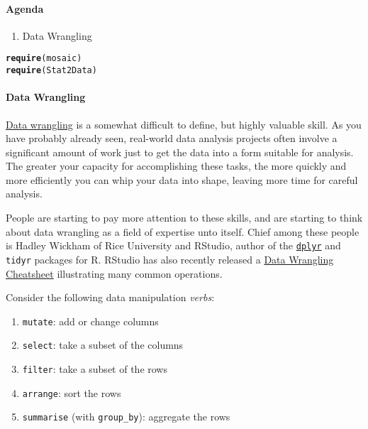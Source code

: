 \documentclass[10pt]{article}\usepackage[]{graphicx}\usepackage[]{color}
\makeatletter
\newcommand{\hlstd}[1]{\textcolor[rgb]{0.345,0.345,0.345}{#1}}%
\newcommand{\hlkwd}[1]{\textcolor[rgb]{0.737,0.353,0.396}{\textbf{#1}}}%
\newenvironment{kframe}{%
 \def\at@end@of@kframe{}%
 \ifinner\ifhmode%
  \def\at@end@of@kframe{\end{minipage}}%
  \begin{minipage}{\columnwidth}%
 \fi\fi%
 \def\FrameCommand##1{\hskip\@totalleftmargin \hskip-\fboxsep
 \colorbox{shadecolor}{##1}\hskip-\fboxsep
     \hskip-\linewidth \hskip-\@totalleftmargin \hskip\columnwidth}%
 \MakeFramed {\advance\hsize-\width
   \@totalleftmargin\z@ \linewidth\hsize
   \@setminipage}}%
 {\par\unskip\endMakeFramed%
 \at@end@of@kframe}
\newenvironment{knitrout}{}{} %
\newcommand{\cmd}[1]{\texttt{#1}}
\makeatother
\begin{document}
\paragraph{Agenda}
\begin{enumerate}
  \itemsep0em
  \item Data Wrangling
\end{enumerate}

\begin{knitrout}
\color{fgcolor}\begin{kframe}
\begin{alltt}
\hlkwd{require}\hlstd{(mosaic)}
\hlkwd{require}\hlstd{(Stat2Data)}
\end{alltt}
\end{kframe}
\end{knitrout}


\paragraph{Data Wrangling}

\href{http://en.wikipedia.org/wiki/Data_wrangling}{Data wrangling} is a somewhat difficult to define, but highly valuable skill. As you have probably already seen, real-world data analysis projects often involve a significant amount of work just to get the data into a form suitable for analysis. The greater your capacity for accomplishing these tasks, the more quickly and more efficiently you can whip your data into shape, leaving more time for careful analysis. 

People are starting to pay more attention to these skills, and are starting to think about data wrangling as a field of expertise unto itself. Chief among these people is Hadley Wickham of Rice University and RStudio, author of the \href{http://cran.r-project.org/web/packages/dplyr/vignettes/introduction.html}{\cmd{dplyr}} and \cmd{tidyr} packages for R. RStudio has also recently released a \href{http://www.rstudio.com/wp-content/uploads/2015/02/data-wrangling-cheatsheet.pdf}{Data Wrangling Cheatsheet} illustrating many common operations. 

Consider the following data manipulation \emph{verbs}:
\begin{enumerate}
  \itemsep0in
  \item \cmd{mutate}: add or change columns
  \item \cmd{select}: take a subset of the columns
  \item \cmd{filter}: take a subset of the rows
  \item \cmd{arrange}: sort the rows
  \item \cmd{summarise} (with \cmd{group\_by}): aggregate the rows
\end{enumerate}
\end{document}
